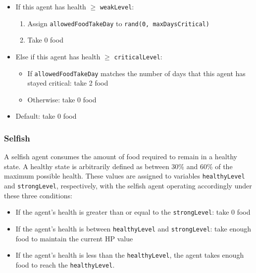 \begin{itemize}
    \item If this agent has health $\geq$ \texttt{weakLevel}:
    \begin{enumerate}
        \item Assign \texttt{allowedFoodTakeDay} to \texttt{rand(0, maxDaysCritical)}
        \item Take 0 food
    \end{enumerate}
    \item Else if this agent has health $\geq$ \texttt{criticalLevel}:
    \begin{itemize}
        \item If \texttt{allowedFoodTakeDay} matches the number of days that this agent has stayed critical: take 2 food
        \item Otherwise: take 0 food
    \end{itemize}
    \item Default: take 0 food
\end{itemize}

\subsubsection{Selfish}

A selfish agent consumes the amount of food required to remain in a healthy state. A healthy state is arbitrarily defined as between 30\% and 60\% of the maximum possible health. These values are assigned to variables \texttt{healthyLevel} and \texttt{strongLevel}, respectively, with the selfish agent operating accordingly under these three conditions:

\begin{itemize}
    \item If the agent's health is greater than or equal to the \texttt{strongLevel}: take 0 food
    \item If the agent's health is between \texttt{healthyLevel} and \texttt{strongLevel}: take enough food to maintain the current HP value
    \item If the agent's health is less than the \texttt{healthyLevel}, the agent takes enough food to reach the \texttt{healthyLevel}.
\end{itemize}




